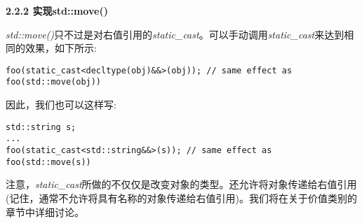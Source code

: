 \hspace*{\fill} \par %
\textbf{2.2.2 实现std::move()}

\textit{std::move()}只不过是对右值引用的\textit{static\_cast}。可以手动调用\textit{static\_cast}来达到相同的效果，如下所示:\par

\begin{lstlisting}[caption={}]
foo(static_cast<decltype(obj)&&>(obj)); // same effect as foo(std::move(obj))
\end{lstlisting}

因此，我们也可以这样写:\par

\begin{lstlisting}[caption={}]
std::string s;
...
foo(static_cast<std::string&&>(s)); // same effect as foo(std::move(s))
\end{lstlisting}

注意，\textit{static\_cast}所做的不仅仅是改变对象的类型。还允许将对象传递给右值引用(记住，通常不允许将具有名称的对象传递给右值引用)。我们将在关于价值类别的章节中详细讨论。\par





























